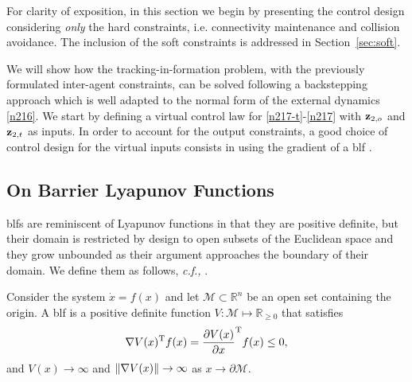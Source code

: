 For clarity of exposition, in this section we begin by presenting the control design considering \emph{only} the hard constraints, i.e. connectivity maintenance and collision avoidance. The inclusion of the soft constraints is addressed in Section~\ref{sec:soft}.

We will show how the tracking-in-formation problem, with the previously formulated inter-agent constraints, can be solved following a backstepping approach which is well adapted to the normal form of the external dynamics \eqref{n216}. We start by defining a virtual control law for \eqref{n217-t}-\eqref{n217} with $\mathbf{z}_{2, o}$ and $\mathbf{z}_{2, t}$ as inputs. 
In order to account for the output constraints, a good choice of control design for the virtual inputs consists in using the gradient of a \acrfull{blf} \cite{tee_barrier_2009}.

\subsection{On Barrier Lyapunov Functions}

\Glspl{blf} are reminiscent of Lyapunov functions in that they are positive definite, but their domain is restricted by design to open subsets of the Euclidean space and they grow unbounded as their argument approaches the boundary of their domain.
We define them as follows, \emph{c.f.,} \cite{tee_barrier_2009}.
\begin{dfn}[BLF]\label{def:TAC-barrier-function}
	Consider the system $\dot{x} = f(x)$ and let $\mathcal M \subset \mathbb{R}^n$ be an open set containing the origin.
	A \gls{blf} is a positive definite function $V : \mathcal M \mapsto \mathbb{R}_{\geq 0}$ that satisfies
	\[%
	\nabla V(x)\T f(x) = \frac{\partial V(x)}{\partial x}\T f(x)\leq 0,\]	
	and $V(x) \rightarrow \infty$ and $\left\|\nabla V(x)\right\| \rightarrow \infty$ as $x \rightarrow \partial \mathcal M$. 
\end{dfn}

